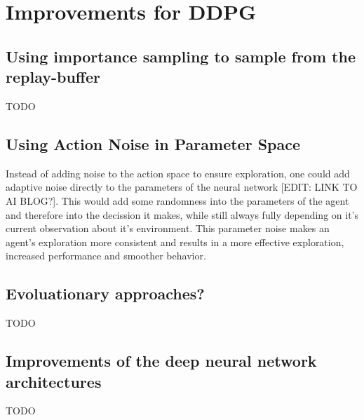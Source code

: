 \section{Improvements for DDPG}
\subsection{Using importance sampling to sample from the replay-buffer}
TODO
\subsection{Using Action Noise in Parameter Space}
Instead of adding noise to the action space to ensure exploration, one could add adaptive noise directly to the parameters of the neural network [EDIT: LINK TO AI BLOG?]. This would add some randomness into the parameters of the agent and therefore into the decission it makes, while still always fully depending on it's current observation about it's environment. This parameter noise makes an agent's exploration more consistent and results in a more effective exploration, increased performance and smoother behavior. 
\subsection{Evoluationary approaches?}
TODO
\subsection{Improvements of the deep neural network architectures}
TODO
\label{sec:1}


